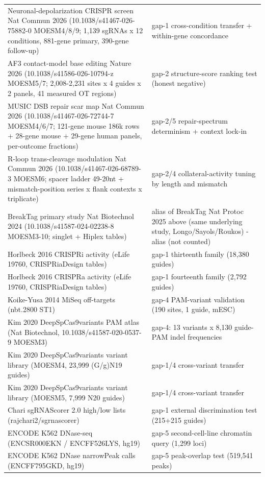 \begin{longtable}{@{}p{}p{}@{}}
Neuronal-depolarization CRISPR screen Nat Commun 2026 (10.1038/s41467-026-75882-0 MOESM4/8/9; 1,139 sgRNAs x 12 conditions, 881-gene primary, 390-gene follow-up) & gap-1 cross-condition transfer + within-gene concordance \\
AF3 contact-model base editing Nature 2026 (10.1038/s41586-026-10794-z MOESM5/7; 2,008-2,231 sites x 4 guides x 2 panels, 41 measured OT regions) & gap-2 structure-score ranking test (honest negative) \\
MUSIC DSB repair scar map Nat Commun 2026 (10.1038/s41467-026-72744-7 MOESM4/6/7; 121-gene mouse 186k rows + 28-gene mouse + 29-gene human panels, per-outcome fractions) & gap-2/5 repair-spectrum determinism + context lock-in \\
R-loop trans-cleavage modulation Nat Commun 2026 (10.1038/s41467-026-68789-3 MOESM6; spacer ladder 49-20nt + mismatch-position series x flank contexts x triplicate) & gap-2/4 collateral-activity tuning by length and mismatch \\
BreakTag primary study Nat Biotechnol 2024 (10.1038/s41587-024-02238-8 MOESM3-10; singlet + Hiplex tables) & alias of BreakTag Nat Protoc 2025 above (same underlying study, Longo/Sayols/Roukos) - alias (not counted) \\
Horlbeck 2016 CRISPRi activity (eLife 19760, CRISPRiaDesign tables) & gap-1 thirteenth family (18,380 guides) \\
Horlbeck 2016 CRISPRa activity (eLife 19760, CRISPRiaDesign tables) & gap-1 fourteenth family (2,792 guides) \\
Koike-Yusa 2014 MiSeq off-targets (nbt.2800 ST1) & gap-4 PAM-variant validation (190 sites, 1 guide, mESC) \\
Kim 2020 DeepSpCas9variants PAM atlas (Nat Biotechnol, 10.1038/s41587-020-0537-9 MOESM3) & gap-4: 13 variants x 8,130 guide-PAM indel frequencies \\
Kim 2020 DeepSpCas9variants variant library (MOESM4, 23,999 (G/g)N19 guides) & gap-1/4 cross-variant transfer \\
Kim 2020 DeepSpCas9variants variant library (MOESM5, 7,999 N20 guides) & gap-1/4 cross-variant transfer \\
Chari sgRNAScorer 2.0 high/low lists (rajchari2/sgrnascorer) & gap-1 external discrimination test (215+215 guides) \\
ENCODE K562 DNase-seq (ENCSR000EKN / ENCFF526LYS, hg19) & gap-5 second-cell-line chromatin query (1,299 loci) \\
ENCODE K562 DNase narrowPeak calls (ENCFF795GKD, hg19) & gap-5 peak-overlap test (519,541 peaks) \\

\end{longtable}
